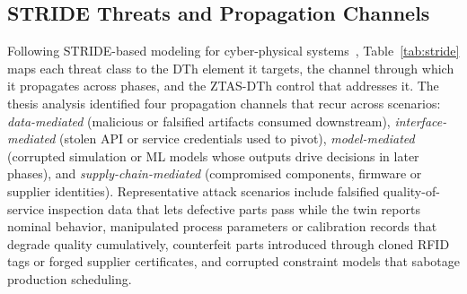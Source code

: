 \documentclass[journal]{IEEEtran}
\newcommand{\ztas}{ZTAS-DTh}
\begin{document}
\subsection{STRIDE Threats and Propagation Channels}
Following STRIDE-based modeling for cyber-physical systems~\cite{khan2017stride,shostack2014tm}, Table~\ref{tab:stride} maps each threat class to the DTh element it targets, the channel through which it propagates across phases, and the \ztas{} control that addresses it. The thesis analysis identified four propagation channels that recur across scenarios: \emph{data-mediated} (malicious or falsified artifacts consumed downstream), \emph{interface-mediated} (stolen API or service credentials used to pivot), \emph{model-mediated} (corrupted simulation or ML models whose outputs drive decisions in later phases), and \emph{supply-chain-mediated} (compromised components, firmware or supplier identities). Representative attack scenarios include falsified quality-of-service inspection data that lets defective parts pass while the twin reports nominal behavior, manipulated process parameters or calibration records that degrade quality cumulatively, counterfeit parts introduced through cloned RFID tags or forged supplier certificates, and corrupted constraint models that sabotage production scheduling.
\end{document}
